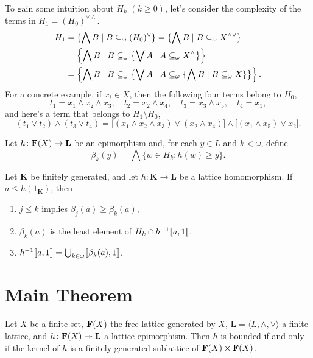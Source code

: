 To gain some intuition about $H_k$ $(k\geq 0)$, let's consider the complexity 
of the terms in $H_1 = (H_0)^{\vee \wedge}$. 
\begin{align*}
  H_1 &= \{\bigwedge B \mid B \subseteq_{\omega} (H_0)^{\vee}\}= \{\bigwedge B \mid B \subseteq_{\omega} X^{\wedge \vee}\}\\
      &= \left\{\bigwedge B \mid B \subseteq_{\omega} \bigl\{\bigvee A \mid A \subseteq_{\omega} X^\wedge \bigr\}\right\}\\
      &= \left\{\bigwedge B \mid B \subseteq_{\omega} \bigl\{\bigvee A \mid A \subseteq_{\omega} \{\bigwedge B \mid B \subseteq_{\omega} X\} \bigr\}\right\}.
\end{align*}
For a concrete example, if $x_i \in X$, then the following four
terms belong to $H_0$,
\[
t_1 = x_1 \wedge x_2 \wedge x_3, \quad t_2 = x_2 \wedge x_4, \quad t_3 = x_3 \wedge x_5, \quad t_4 = x_1,
\]
and here's a term that belongs to $H_1 \setminus H_0$,
\[
(t_1 \vee t_2) \wedge (t_3 \vee t_4) = \bigl[(x_1 \wedge x_2 \wedge x_3) \vee (x_2 \wedge x_4)\bigr] \wedge \bigl[(x_1 \wedge x_5)\vee x_2\bigr].
\]

Let $h \colon  \mathbf{F}(X) \to \mathbf{L}$ be an epimorphism and, 
for each $y \in L$ and $k< \omega$, define
\[
\beta_k(y) = \bigwedge \{w \in H_k : h(w) \geqslant y\}.
\]

\begin{theorem}\label{thm:2.2}
   Let $\mathbf K$ be finitely generated, and let $h \colon \mathbf K \to \mathbf L$ be a lattice
  homomorphism. If $a \leq h(1_{\mathbf K})$, then
\begin{enumerate}
\item $j \leq k$ implies $\beta_j(a) \geq \beta_k(a)$,
\item  $\beta_k(a)$ is the least element of $H_k \cap h^{-1}\llbracket a, 1 \rrbracket$,
\item  $h^{-1}\llbracket a, 1 \rrbracket = \bigcup_{k\in \omega}\llbracket \beta_k(a), 1 \rrbracket$.
\end{enumerate}  
\end{theorem}

\section{Main Theorem}

\begin{theorem}
\label{thm:main}
Let $X$ be a finite set, $\mathbf{F} (X)$ the free lattice 
generated by $X$, $\mathbf L = \langle L, \wedge, \vee\rangle$ a finite lattice, and 
$h\colon \mathbf{F}(X) \twoheadrightarrow \mathbf{L}$ a lattice epimorphism.
Then $h$ is bounded if and only if the kernel of $h$ is a finitely generated 
sublattice of $\mathbf{F} (X) \times \mathbf{F} (X)$.
\end{theorem}


